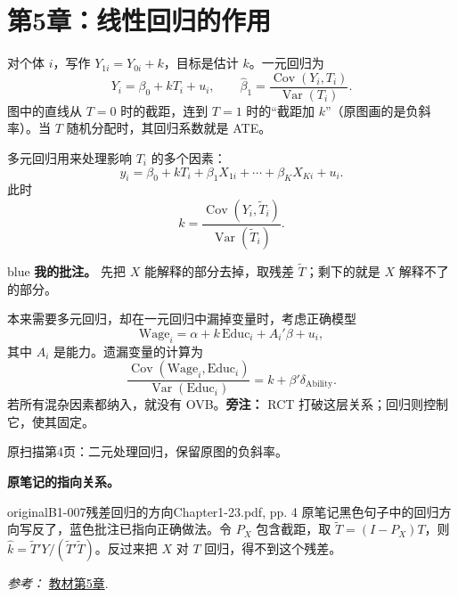 {\section{第5章：线性回归的作用}
对个体 $i$，写作 $Y_{1i}=Y_{0i}+k$，目标是估计 $k$。一元回归为
\[Y_i=\beta_0+kT_i+u_i,\qquad \hat\beta_1=\frac{\operatorname{Cov}(Y_i,T_i)}{\operatorname{Var}(T_i)}.\]
图中的直线从 $T=0$ 时的截距，连到 $T=1$ 时的“截距加 $k$”（原图画的是负斜率）。当 $T$ 随机分配时，其回归系数就是 ATE。

多元回归用来处理影响 $T_i$ 的多个因素：
\[y_i=\beta_0+kT_i+\beta_1X_{1i}+\cdots+\beta_KX_{Ki}+u_i.\]
 此时
\[k=\frac{\operatorname{Cov}(Y_i,\widetilde T_i)}{\operatorname{Var}(\widetilde T_i)}.\]
\begin{inkblock}{blue}
\textbf{我的批注。} 先把 $X$ 能解释的部分去掉，取残差 $\widetilde T$；剩下的就是 $X$ 解释不了的部分。
\end{inkblock}

本来需要多元回归，却在一元回归中漏掉变量时，考虑正确模型
\[\mathrm{Wage}_i=\alpha+k\,\mathrm{Educ}_i+A_i'\beta+u_i,\]
其中 $A_i$ 是能力。遗漏变量的计算为
\[\frac{\operatorname{Cov}(\mathrm{Wage}_i,\mathrm{Educ}_i)}{\operatorname{Var}(\mathrm{Educ}_i)}=k+\beta'\delta_{\mathrm{Ability}}.\]
 若所有混杂因素都纳入，就没有 OVB。\textbf{旁注：} RCT 打破这层关系；回归则控制它，使其固定。

\begin{center}
\par{\small 原扫描第4页：二元处理回归，保留原图的负斜率。}
\end{center}
\par{}\smallskip\textbf{原笔记的指向关系。}\par\smallskip
{}
\begin{reviewnote}{original}{B1-007}{残差回归的方向}{Chapter1-23.pdf, pp. 4}
原笔记黑色句子中的回归方向写反了，蓝色批注已指向正确做法。令 $P_X$ 包含截距，取 $\widetilde T=(I-P_X)T$，则 $\hat k=\widetilde T'Y/(\widetilde T'\widetilde T)$。反过来把 $X$ 对 $T$ 回归，得不到这个残差。
\par\smallskip\textit{参考：} \href{https://matheusfacure.github.io/python-causality-handbook/05-The-Unreasonable-Effectiveness-of-Linear-Regression.html}{教材第5章}.
\end{reviewnote}

}
